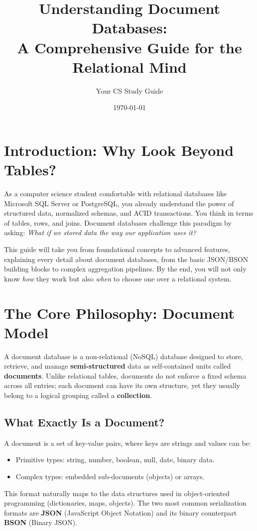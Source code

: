 \documentclass[12pt,a4paper]{article}
\title{\textbf{Understanding Document Databases:\\ A Comprehensive Guide for the Relational Mind}}
\author{Your CS Study Guide}
\date{\today}
\begin{document}
\maketitle
\tableofcontents
\newpage

\section{Introduction: Why Look Beyond Tables?}
As a computer science student comfortable with relational databases like Microsoft SQL Server or PostgreSQL, you already understand the power of structured data, normalized schemas, and ACID transactions. You think in terms of tables, rows, and joins. Document databases challenge this paradigm by asking: \textit{What if we stored data the way our application uses it?}

This guide will take you from foundational concepts to advanced features, explaining every detail about document databases, from the basic JSON/BSON building blocks to complex aggregation pipelines. By the end, you will not only know \textit{how} they work but also \textit{when} to choose one over a relational system.

\section{The Core Philosophy: Document Model}
A document database is a non-relational (NoSQL) database designed to store, retrieve, and manage \textbf{semi-structured} data as self-contained units called \textbf{documents}. Unlike relational tables, documents do not enforce a fixed schema across all entries; each document can have its own structure, yet they usually belong to a logical grouping called a \textbf{collection}.

\subsection{What Exactly Is a Document?}
A document is a set of key-value pairs, where keys are strings and values can be:
\begin{itemize}[noitemsep]
    \item Primitive types: string, number, boolean, null, date, binary data.
    \item Complex types: embedded sub-documents (objects) or arrays.
\end{itemize}
This format naturally maps to the data structures used in object-oriented programming (dictionaries, maps, objects). The two most common serialization formats are \textbf{JSON} (JavaScript Object Notation) and its binary counterpart \textbf{BSON} (Binary JSON).
\end{document}
